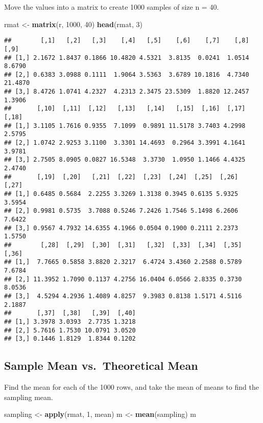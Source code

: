 \documentclass[]{article}
\newenvironment{Shaded}{\begin{snugshade}}{\end{snugshade}}
\newcommand{\KeywordTok}[1]{\textcolor[rgb]{0.13,0.29,0.53}{\textbf{{#1}}}}
\newcommand{\DecValTok}[1]{\textcolor[rgb]{0.00,0.00,0.81}{{#1}}}
\newcommand{\StringTok}[1]{\textcolor[rgb]{0.31,0.60,0.02}{{#1}}}
\newcommand{\NormalTok}[1]{{#1}}
\begin{document}
Move the values into a matrix to create 1000 samples of size n = 40.

\begin{Shaded}
\begin{Highlighting}[]
\NormalTok{rmat <-}\StringTok{ }\KeywordTok{matrix}\NormalTok{(r, }\DecValTok{1000}\NormalTok{, }\DecValTok{40}\NormalTok{)}
\KeywordTok{head}\NormalTok{(rmat, }\DecValTok{3}\NormalTok{)}
\end{Highlighting}
\end{Shaded}

\begin{verbatim}
##        [,1]   [,2]   [,3]    [,4]   [,5]    [,6]    [,7]    [,8]    [,9]
## [1,] 2.1672 1.8437 0.1866 10.4820 4.5321  3.8135  0.0241  1.0514  8.6790
## [2,] 0.6383 3.0988 0.1111  1.9064 3.5363  3.6789 10.1816  4.7340 21.4870
## [3,] 8.4726 1.0741 4.2327  4.2313 2.3475 23.5309  1.8820 12.2457  1.3906
##       [,10]  [,11]  [,12]   [,13]   [,14]   [,15]  [,16]  [,17]  [,18]
## [1,] 3.1105 1.7616 0.9355  7.1099  0.9891 11.5178 3.7403 4.2998 2.5795
## [2,] 1.0742 2.9253 3.1100  3.3301 14.4693  0.2964 3.3991 4.1641 3.9781
## [3,] 2.7505 8.0905 0.0827 16.5348  3.3730  1.0950 1.1466 4.4325 2.4740
##       [,19]  [,20]   [,21]  [,22]  [,23]  [,24]  [,25]  [,26]  [,27]
## [1,] 0.6485 0.5684  2.2255 3.3269 1.3138 0.3945 0.6135 5.9325 3.5954
## [2,] 0.9981 0.5735  3.7088 0.5246 7.2426 1.7546 5.1498 6.2606 7.6422
## [3,] 0.9567 4.7932 14.6355 4.1966 0.0504 0.1900 0.2111 2.2373 1.5750
##        [,28]  [,29]  [,30]  [,31]   [,32]  [,33]  [,34]  [,35]  [,36]
## [1,]  7.7665 0.5858 3.8820 2.3217  6.4724 3.4360 2.2588 0.5789 7.6784
## [2,] 11.3952 1.7090 0.1137 4.2756 16.0404 6.0566 2.8335 0.3730 8.0536
## [3,]  4.5294 4.2936 1.4089 4.8257  9.3983 0.8138 1.5171 4.5116 2.1887
##       [,37]  [,38]   [,39]  [,40]
## [1,] 3.3978 3.0393  2.7735 1.3218
## [2,] 5.7616 1.7530 10.0791 3.0520
## [3,] 0.1446 1.8129  1.8344 0.1202
\end{verbatim}

\subsection{Sample Mean vs.~Theoretical
Mean}\label{sample-mean-vs.theoretical-mean}

Find the mean for each of the 1000 rows, and take the mean of means to
find the sampling mean.

\begin{Shaded}
\begin{Highlighting}[]
\NormalTok{sampling <-}\StringTok{ }\KeywordTok{apply}\NormalTok{(rmat, }\DecValTok{1}\NormalTok{, mean)}
\NormalTok{m <-}\StringTok{ }\KeywordTok{mean}\NormalTok{(sampling)}
\NormalTok{m}
\end{Highlighting}
\end{Shaded}
\end{document}
